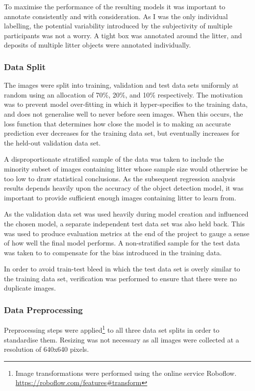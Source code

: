 \documentclass{thesis}
\begin{document}
To maximise the performance of the resulting models it was important to annotate consistently and with consideration. As I was the only individual labelling, the potential variability introduced by the subjectivity of multiple participants was not a worry. A tight box was annotated around the litter, and deposits of multiple litter objects were annotated individually.

\subsubsection{Data Split}

The images were split into training, validation and test data sets uniformly at random using an allocation of 70\%, 20\%, and 10\% respectively. The motivation was to prevent model over-fitting in which it hyper-specifies to the training data, and does not generalise well to never before seen images. When this occurs, the loss function that determines how close the model is to making an accurate prediction ever decreases for the training data set, but eventually increases for the held-out validation data set.

A disproportionate stratified sample of the data was taken to include the minority subset of images containing litter whose sample size would otherwise be too low to draw statistical conclusions. As the subsequent regression analysis results depends heavily upon the accuracy of the object detection model, it was important to provide sufficient enough images containing litter to learn from.

As the validation data set was used heavily during model creation and influenced the chosen model, a separate independent test data set was also held back. This was used to produce evaluation metrics at the end of the project to gauge a sense of how well the final model performs. A non-stratified sample for the test data was taken to to compensate for the bias introduced in the training data.

In order to avoid train-test bleed in which the test data set is overly similar to the training data set, verification was performed to ensure that there were no duplicate images.

\subsubsection{Data Preprocessing}

Preprocessing steps were applied\footnote{Image transformations were performed using the online service Roboflow. \url{https://roboflow.com/features\#transform}} to all three data set splits in order to standardise them. Resizing was not necessary as all images were collected at a resolution of 640x640 pixels. 
\end{document}
